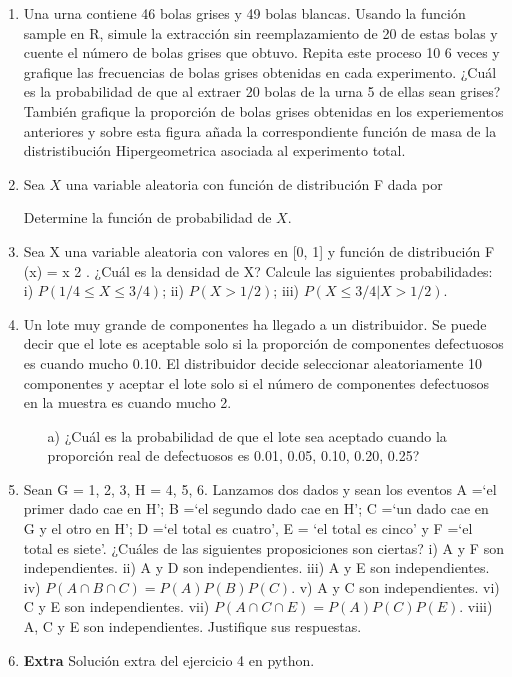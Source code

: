 \documentclass[11pt,letterpaper]{article}
\begin{document}
\begin{enumerate}
\item Una urna contiene 46 bolas grises y 49 bolas blancas. Usando la función sample en R, simule
la extracción sin reemplazamiento de 20 de estas bolas y cuente el número de bolas grises que
obtuvo. Repita este proceso 10 6 veces y grafique las frecuencias de bolas grises obtenidas en
cada experimento. ¿Cuál es la probabilidad de que al extraer 20 bolas de la urna 5 de ellas
sean grises? También grafique la proporción de bolas grises obtenidas en los experiementos
anteriores y sobre esta figura añada la correspondiente función de masa de la distristibución
Hipergeometrica asociada al experimento total.

\item Sea $X$ una variable aleatoria con función de distribución F dada por

Determine la función de probabilidad de $X$.


\item Sea X una variable aleatoria con valores en [0, 1] y función de distribución F (x) = x 2 . ¿Cuál es
la densidad de X? Calcule las siguientes probabilidades: i) $P (1/4 \leq X \leq 3/4)$; ii) $P(X > 1/2)$;
iii) $P(X \leq 3/4|X > 1/2)$.

\item Un lote muy grande de componentes ha llegado a un distribuidor. Se puede decir que el
lote es aceptable solo si la proporción de componentes defectuosos es cuando mucho 0.10.
El distribuidor decide seleccionar aleatoriamente 10 componentes y aceptar el lote solo si el
número de componentes defectuosos en la muestra es cuando mucho 2.

\begin{itemize}
\item[a)] ¿Cuál es la probabilidad de que el lote sea aceptado cuando la proporción real de defectuosos es 0.01, 0.05, 0.10, 0.20, 0.25?
\end{itemize}

\item Sean G = {1, 2, 3}, H = {4, 5, 6}. Lanzamos dos dados y sean los eventos A =‘el primer dado
cae en H’; B =‘el segundo dado cae en H’; C =‘un dado cae en G y el otro en H’; D =‘el
total es cuatro’, E = ‘el total es cinco’ y F =‘el total es siete’. ¿Cuáles de las siguientes proposiciones son ciertas? i) A y F son independientes. ii) A y D son independientes. iii) A
y E son independientes. iv) $P(A \cap B \cap C) = P (A)P (B)P (C)$. v) A y C son independientes.
vi) C y E son independientes. vii) $P (A \cap C \cap E) = P (A)P (C)P (E)$. viii) A, C y E son
independientes. Justifique sus respuestas.


\item \textbf{Extra} 
Solución extra del ejercicio 4 en python. 




\end{enumerate}
\end{document}
